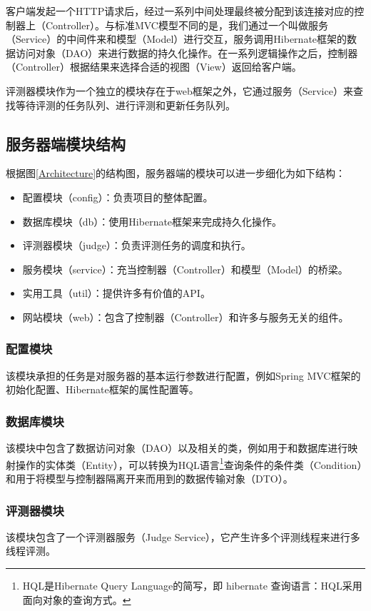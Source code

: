 客户端发起一个HTTP请求后，经过一系列中间处理最终被分配到该连接对应的控制器上（Controller）。与标准MVC模型不同的是，我们通过一个叫做服务（Service）的中间件来和模型（Model）进行交互，服务调用Hibernate框架的数据访问对象（DAO）来进行数据的持久化操作。在一系列逻辑操作之后，控制器（Controller）根据结果来选择合适的视图（View）返回给客户端。

评测器模块作为一个独立的模块存在于web框架之外，它通过服务（Service）来查找等待评测的任务队列、进行评测和更新任务队列。

\subsection{服务器端模块结构}\label{sec:serverModelStructure}
根据图\ref{Architecture}的结构图，服务器端的模块可以进一步细化为如下结构：
\begin{itemize}
	\item 配置模块（config）：负责项目的整体配置。
	\item 数据库模块（db）：使用Hibernate框架来完成持久化操作。
	\item 评测器模块（judge）：负责评测任务的调度和执行。
	\item 服务模块（service）：充当控制器（Controller）和模型（Model）的桥梁。
	\item 实用工具（util）：提供许多有价值的API。
	\item 网站模块（web）：包含了控制器（Controller）和许多与服务无关的组件。
\end{itemize}

\subsubsection{配置模块}
该模块承担的任务是对服务器的基本运行参数进行配置，例如Spring MVC框架的初始化配置、Hibernate框架的属性配置等。

\subsubsection{数据库模块}
该模块中包含了数据访问对象（DAO）以及相关的类，例如用于和数据库进行映射操作的实体类（Entity），可以转换为HQL语言\footnote{HQL是Hibernate Query Language的简写，即 hibernate 查询语言：HQL采用面向对象的查询方式。}查询条件的条件类（Condition）和用于将模型与控制器隔离开来而用到的数据传输对象（DTO）。

\subsubsection{评测器模块}
该模块包含了一个评测器服务（Judge Service），它产生许多个评测线程来进行多线程评测。

